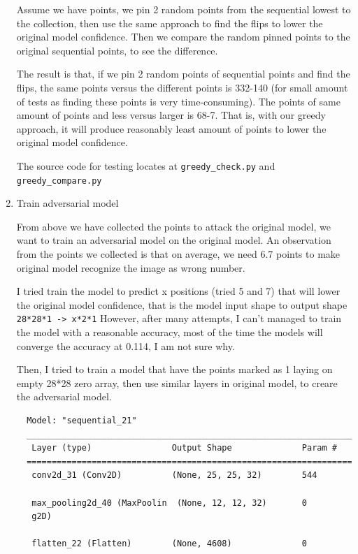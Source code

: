 \documentclass[
]{article}
\begin{document}
\begin{enumerate}
  Assume we have points, we pin 2 random points from the sequential
  lowest to the collection, then use the same approach to find the flips
  to lower the original model confidence. Then we compare the random
  pinned points to the original sequential points, to see the
  difference.

  The result is that, if we pin 2 random points of sequential points and
  find the flips, the same points versus the different points is 332-140
  (for small amount of tests as finding these points is very
  time-consuming). The points of same amount of points and less versus
  larger is 68-7. That is, with our greedy approach, it will produce
  reasonably least amount of points to lower the original model
  confidence.

  The source code for testing locates at \texttt{greedy\_check.py} and
  \texttt{greedy\_compare.py}
\item
  Train adversarial model

  From above we have collected the points to attack the original model,
  we want to train an adversarial model on the original model. An
  observation from the points we collected is that on average, we need
  6.7 points to make original model recognize the image as wrong number.

  I tried train the model to predict x positions (tried 5 and 7) that
  will lower the original model confidence, that is the model input
  shape to output shape \texttt{28*28*1\ -\textgreater{}\ x*2*1}
  However, after many attempts, I can't managed to train the model with
  a reasonable accuracy, most of the time the models will converge the
  accuracy at 0.114, I am not sure why.

  Then, I tried to train a model that have the points marked as 1 laying
  on empty 28*28 zero array, then use similar layers in original model,
  to creare the adversarial model.
\newpage
\begin{verbatim}
  Model: "sequential_21"
  _________________________________________________________________
   Layer (type)                Output Shape              Param #   
  =================================================================
   conv2d_31 (Conv2D)          (None, 25, 25, 32)        544       

   max_pooling2d_40 (MaxPoolin  (None, 12, 12, 32)       0         
   g2D)                                                            

   flatten_22 (Flatten)        (None, 4608)              0         


\end{verbatim}
\end{enumerate}
\end{document}
